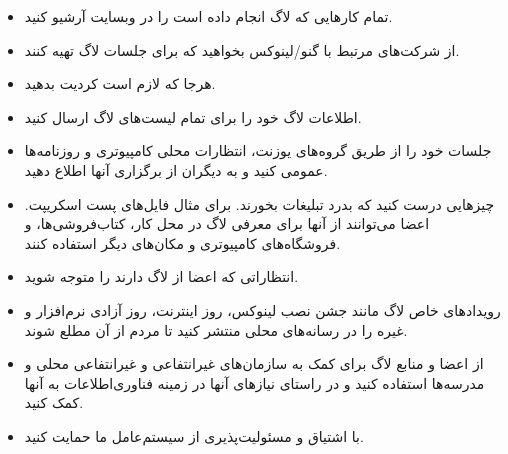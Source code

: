 \begin{itemize}
\item
تمام کارهایی که لاگ انجام داده است را در وبسایت آرشیو کنید.
\item
از شرکت‌های مرتبط با گنو/لینوکس بخواهید که برای جلسات لاگ
تهیه کنند.
\item
هرجا که لازم است کردیت بدهید.
\item
اطلاعات لاگ خود را برای تمام لیست‌های لاگ ارسال کنید.
\item
جلسات‌ خود را از طریق گروه‌های یوزنت، انتظارات محلی کامپیوتری و روزنامه‌ها
عمومی کنید و به دیگران از برگزاری آنها اطلاع دهید.
\item
چیزهایی درست کنید که بدرد تبلیغات بخورند. برای مثال فایل‌های پست اسکریپت.
اعضا می‌توانند از آنها برای معرفی لاگ در محل کار، کتاب‌فروشی‌ها، و فروشگاه‌های کامپیوتری
و مکان‌های دیگر استفاده کنند.
\item
انتظاراتی که اعضا از لاگ دارند را متوجه شوید.
\item
رویدادهای خاص لاگ مانند جشن نصب لینوکس، روز اینترنت، روز آزادی نرم‌افزار
و غیره را در رسانه‌های محلی منتشر کنید تا مردم از آن مطلع شوند.
\item
از اعضا و منابع لاگ برای کمک به سازمان‌های غیرانتفاعی و غیرانتفاعی محلی
و مدرسه‌ها استفاده کنید و در راستای نیازهای آنها در زمینه فناوری‌اطلاعات
به آنها کمک کنید.
\item
با اشتیاق و مسئولیت‌پذیری از سیستم‌عامل ما حمایت کنید.

\end{itemize}
